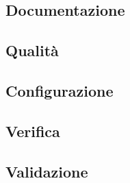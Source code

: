 \subsection{Documentazione}
     

\subsection{Qualità}
     
     
\subsection{Configurazione}
     

\subsection{Verifica}
     

\subsection{Validazione}
     